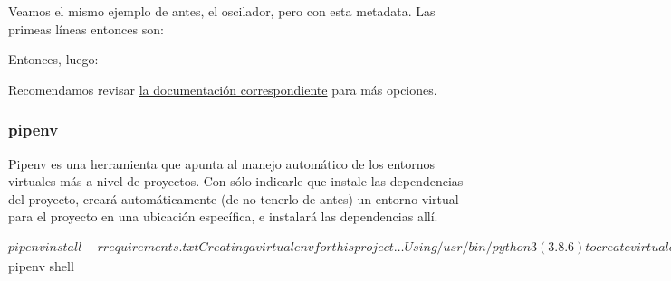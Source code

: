 Veamos el mismo ejemplo de antes, el oscilador, pero con esta metadata. Las primeas líneas entonces son:


Entonces, luego:


Recomendamos revisar \href{https://docs.astral.sh/uv/}{la documentación correspondiente} para más opciones.


\subsubsection{pipenv}

Pipenv es una herramienta que apunta al manejo automático de los entornos virtuales más a nivel de proyectos. Con sólo indicarle que instale las dependencias del proyecto, creará automáticamente (de no tenerlo de antes) un entorno virtual para el proyecto en una ubicación específica, e instalará las dependencias allí.

\begin{shell}
    $ pipenv install -r requirements.txt
    Creating a virtualenv for this project…
    Using /usr/bin/python3 (3.8.6) to create virtualenv…
    ⠋created virtual environment CPython3.8.6.final.0-64 in 104ms
    creator CPython3Posix(dest=/home/facundo/.local/share/virtualenvs/trunk-qJfLQWAx, clear=False, global=False)
    seeder FromAppData(download=False, pip=bundle, setuptools=bundle, wheel=bundle, via=copy, app_data_dir=/home/facundo/.local/share/virtualenv)
    added seed packages: pip==20.1.1, pkg_resources==0.0.0, setuptools==44.0.0, wheel==0.34.2
    activators BashActivator,CShellActivator,FishActivator,PowerShellActivator,PythonActivator,XonshActivator
    Virtualenv location: /home/facundo/.local/share/virtualenvs/trunk-qJfLQWAx
    Creating a Pipfile for this project…
    Requirements file provided! Importing into Pipfile…
    Pipfile.lock not found, creating…
    Locking [dev-packages] dependencies…
    Locking [packages] dependencies…
    Updated Pipfile.lock (00d0fa)!
    Installing dependencies from Pipfile.lock (00d0fa)…
    🐍   ▉▉▉▉▉▉▉▉▉▉▉▉▉▉▉▉▉▉▉▉▉▉▉▉▉▉▉▉▉▉▉▉ 4/4 — 00:00:04
    To activate this project's virtualenv, run the following:
    ‎  $ pipenv shell
\end{shell}


